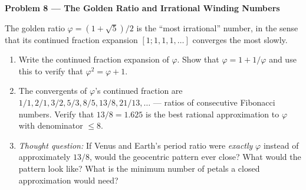 \documentclass[11pt,letterpaper]{article}
\begin{document}
\begin{challenge}
\textbf{Problem 8 — The Golden Ratio and Irrational Winding Numbers}

The golden ratio $\varphi = (1+\sqrt{5})/2$ is the ``most irrational''
number, in the sense that its continued fraction expansion
$[1; 1, 1, 1, \ldots]$ converges the most slowly.
\begin{enumerate}[label=(\alph*)]
  \item Write the continued fraction expansion of $\varphi$. Show
    that $\varphi = 1 + 1/\varphi$ and use this to verify that
    $\varphi^2 = \varphi + 1$.
  \item The convergents of $\varphi$'s continued fraction are
    $1/1, 2/1, 3/2, 5/3, 8/5, 13/8, 21/13, \ldots$ — ratios of
    consecutive Fibonacci numbers. Verify that $13/8 = 1.625$ is
    the best rational approximation to $\varphi$ with denominator
    $\leq 8$.
  \item \textit{Thought question:} If Venus and Earth's period ratio
    were \textit{exactly} $\varphi$ instead of approximately $13/8$,
    would the geocentric pattern ever close? What would the pattern
    look like? What is the minimum number of petals a closed
    approximation would need?
\end{enumerate}
\end{challenge}
\end{document}
